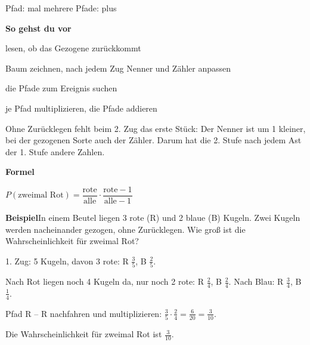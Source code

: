 \documentclass[11pt]{article}
\newcommand{\nr}[1]{\makebox[7mm][l]{\textbf{#1}}}
\begin{document}
\begin{tcolorbox}[colback=mbkasten,colframe=mbgrau,boxrule=0.5pt,arc=1mm,left=3mm,right=3mm,top=2mm,bottom=2mm,title={\bfseries Formel auf einen Blick},coltitle=black,colbacktitle=black!10]
{\Large Pfad: mal \qquad mehrere Pfade: plus}\par\medskip
\textbf{So gehst du vor}\par
\nr{1}lesen, ob das Gezogene zurückkommt\par
\nr{2}Baum zeichnen, nach jedem Zug Nenner und Zähler anpassen\par
\nr{3}die Pfade zum Ereignis suchen\par
\nr{4}je Pfad multiplizieren, die Pfade addieren\par
\medskip
\end{tcolorbox}
\clearpage\label{s:A}\noindent\colorbox{black!12}{}\hspace{3mm}{\Large\bfseries Zweimal ziehen: eins weniger}\par\smallskip
\noindent Ohne Zurücklegen fehlt beim 2. Zug das erste Stück: Der Nenner ist um 1 kleiner, bei der gezogenen Sorte auch der Zähler. Darum hat die 2. Stufe nach jedem Ast der 1. Stufe andere Zahlen.\par\medskip
\noindent\textbf{Formel}\par\nopagebreak\noindent\hspace*{4mm}\begin{minipage}{\dimexpr\linewidth-4mm\relax}$P(\text{zweimal Rot}) = \dfrac{\text{rote}}{\text{alle}} \cdot \dfrac{\text{rote} - 1}{\text{alle} - 1}$\end{minipage}\par\medskip
\noindent\textbf{Beispiel}\quad In einem Beutel liegen 3 rote (R) und 2 blaue (B) Kugeln. Zwei Kugeln werden nacheinander gezogen, ohne Zurücklegen. Wie groß ist die Wahrscheinlichkeit für zweimal Rot?\par\smallskip
\noindent\begin{minipage}[t]{0.6\linewidth}\vspace{0pt}\par\noindent{}1. Zug: 5 Kugeln, davon 3 rote: R $\frac{3}{5}$, B $\frac{2}{5}$.\par\smallskip\par\noindent{}Nach Rot liegen noch 4 Kugeln da, nur noch 2 rote: R $\frac{2}{4}$, B $\frac{2}{4}$. Nach Blau: R $\frac{3}{4}$, B $\frac{1}{4}$.\par\smallskip\par\noindent{}Pfad R – R nachfahren und multiplizieren: $\frac{3}{5} \cdot \frac{2}{4} = \frac{6}{20} = \frac{3}{10}$.\par\smallskip\par\noindent{}Die Wahrscheinlichkeit für zweimal Rot ist $\frac{3}{10}$.\par\smallskip\end{minipage}\hfill
\end{document}
